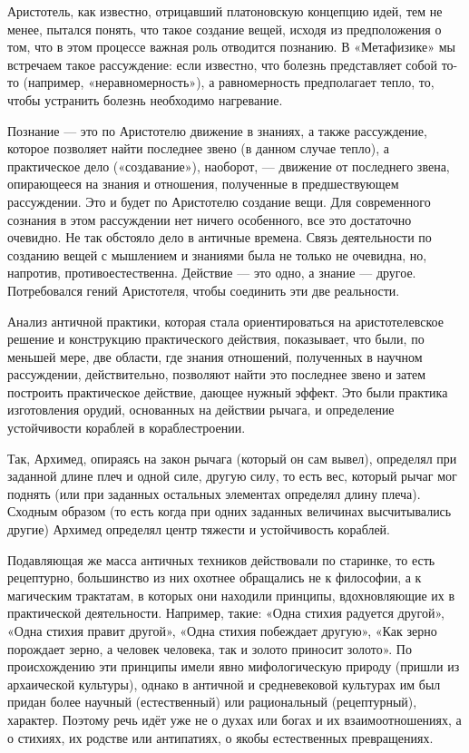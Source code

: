 \documentclass[a4paper]{article}
\begin{document}
{Аристотель, как известно, отрицавший платоновскую концепцию идей, тем не менее, пытался понять, что такое создание вещей, исходя из предположения о том, что в этом процессе важная роль отводится познанию. В «Метафизике» мы встречаем такое рассуждение: если известно, что болезнь представляет собой то-то (например, «неравномерность»), а равномерность предполагает тепло, то, чтобы устранить болезнь необходимо нагревание.

Познание — это по Аристотелю движение в знаниях, а также рассуждение, которое позволяет найти последнее звено (в данном случае тепло), а практическое дело («создавание»), наоборот, — движение от последнего звена, опирающееся на знания и отношения, полученные в предшествующем рассуждении. Это и будет по Аристотелю создание вещи. Для современного сознания в этом рассуждении нет ничего особенного, все это достаточно очевидно. Не так обстояло дело в античные времена. Связь деятельности по созданию вещей с мышлением и знаниями была не только не очевидна, но, напротив, противоестественна. Действие — это одно, а знание — другое. Потребовался гений Аристотеля, чтобы соединить эти две реальности.

Анализ античной практики, которая стала ориентироваться на аристотелевское решение и конструкцию практического действия, показывает, что были, по меньшей мере, две области, где знания отношений, полученных в научном рассуждении, действительно, позволяют найти это последнее звено и затем построить практическое действие, дающее нужный эффект. Это были практика изготовления орудий, основанных на действии рычага, и определение устойчивости кораблей в кораблестроении.

Так, Архимед, опираясь на закон рычага (который он сам вывел), определял при заданной длине плеч и одной силе, другую силу, то есть вес, который рычаг мог поднять (или при заданных остальных элементах определял длину плеча). Сходным образом (то есть когда при одних заданных величинах высчитывались другие) Архимед определял центр тяжести и устойчивость кораблей.

Подавляющая же масса античных техников действовали по старинке, то есть рецептурно, большинство из них охотнее обращались не к философии, а к магическим трактатам, в которых они находили принципы, вдохновляющие их в практической деятельности. Например, такие: «Одна стихия радуется другой», «Одна стихия правит другой», «Одна стихия побеждает другую», «Как зерно порождает зерно, а человек человека, так и золото приносит золото». По происхождению эти принципы имели явно мифологическую природу (пришли из архаической культуры), однако в античной и средневековой культурах им был придан более научный (естественный) или рациональный (рецептурный), характер. Поэтому речь идёт уже не о духах или богах и их взаимоотношениях, а о стихиях, их родстве или антипатиях, о якобы естественных превращениях.

}
\end{document}
